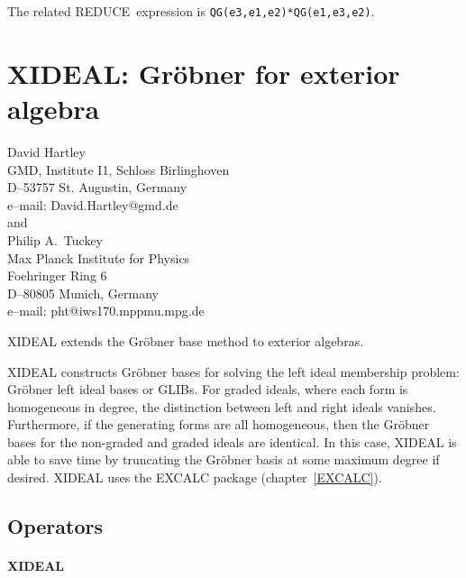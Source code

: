 \documentclass[11pt,letterpaper]{book}
\makeatletter
\newcommand{\REDUCE}{REDUCE}
\newcommand{\underscore}{\_}
\newcommand{\ttindex}[1]{{\renewcommand{\_}{\protect\underscore}%
                          \index{#1@{\tt #1}}}}
\makeatother
\begin{document}
The related \REDUCE\ expression is {\tt QG(e3,e1,e2)*QG(e1,e3,e2)}.

\chapter{XIDEAL: Gr\"obner for exterior algebra}
\label{XIDEAL}

{\footnotesize
\begin{center}
David Hartley \\
GMD, Institute I1, Schloss Birlinghoven \\
D--53757 St. Augustin, Germany \\[0.05in]
e--mail: David.Hartley@gmd.de \\[0.1in]
and \\
Philip A.~Tuckey \\
Max Planck Institute for Physics \\
Foehringer Ring 6 \\
D--80805 Munich, Germany \\[0.05in]
e--mail: pht@iws170.mppmu.mpg.de
\end{center}
}
\ttindex{XIDEAL}

XIDEAL extends the Gr\"obner base method to exterior algebras.

XIDEAL constructs Gr\"obner bases for solving the left ideal membership
problem: Gr\"obner left ideal bases or GLIBs. For graded ideals, where each
form is homogeneous in degree, the distinction between left and right
ideals vanishes.  Furthermore, if the generating forms are all homogeneous,
then the Gr\"obner bases for the non-graded and graded ideals are
identical.  In this case, XIDEAL is able to save time by truncating the
Gr\"obner basis at some maximum degree if desired.
XIDEAL uses the EXCALC package (chapter~\ref{EXCALC}).

\section{Operators}

\subsubsection*{XIDEAL}
\end{document}
